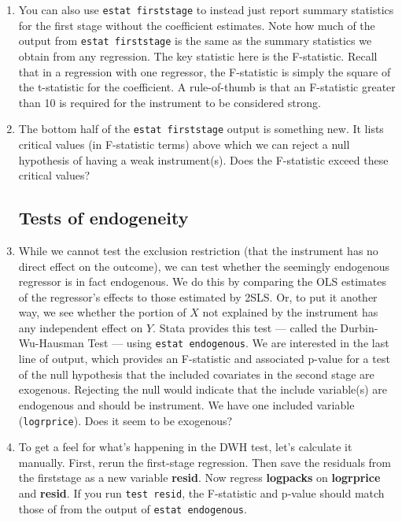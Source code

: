\documentclass[a4paper,12pt]{article}
\begin{document}
\begin{enumerate}
\item You can also use \texttt{estat firststage} to instead just report summary statistics for the first stage without the coefficient estimates. Note how much of the output from \texttt{estat firststage} is the same as the summary statistics we obtain from any regression. The key statistic here is the F-statistic. Recall that in a regression with one regressor, the F-statistic is simply the square of the t-statistic for the coefficient. A rule-of-thumb is that an F-statistic greater than 10 is required for the instrument to be considered strong.

\item The bottom half of the \texttt{estat firststage} output is something new. It lists critical values (in F-statistic terms) above which we can reject a null hypothesis of having a weak instrument(s). Does the F-statistic exceed these critical values?

\subsection*{Tests of endogeneity}

\item While we cannot test the exclusion restriction (that the instrument has no direct effect on the outcome), we can test whether the seemingly endogenous regressor is in fact endogenous. We do this by comparing the OLS estimates of the regressor's effects to those estimated by 2SLS. Or, to put it another way, we see whether the portion of $X$ not explained by the instrument has any independent effect on $Y$. Stata provides this test --- called the Durbin-Wu-Hausman Test --- using \texttt{estat endogenous}. We are interested in the last line of output, which provides an F-statistic and associated p-value for a test of the null hypothesis that the included covariates in the second stage are exogenous. Rejecting the null would indicate that the include variable(s) are endogenous and should be instrument. We have one included variable (\texttt{logrprice}). Does it seem to be exogenous?

\item To get a feel for what's happening in the DWH test, let's calculate it manually. First, rerun the first-stage regression. Then save the residuals from the firststage as a new variable \textbf{resid}. Now regress \textbf{logpacks} on \textbf{logrprice} and \textbf{resid}. If you run \texttt{test resid}, the F-statistic and p-value should match those of from the output of \texttt{estat endogenous}.



\end{enumerate}
\end{document}
